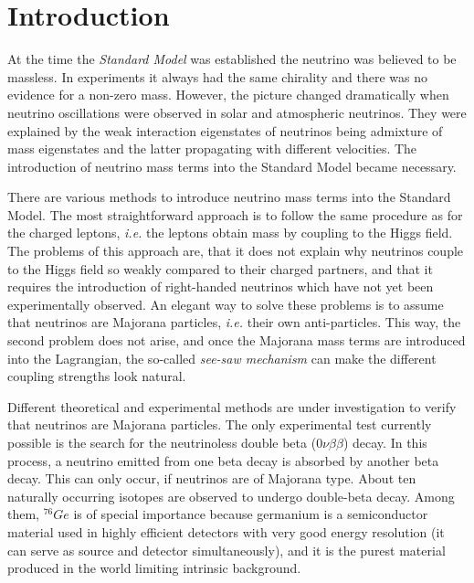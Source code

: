 \chapter*{Introduction}
\label{cha:intro}
At the time the \emph{Standard Model} was established the neutrino was believed to be massless. In experiments it always had the same chirality and there was no evidence for a non-zero mass. However, the picture changed dramatically when neutrino oscillations were observed in solar and atmospheric neutrinos. They were explained by the weak interaction eigenstates of neutrinos being admixture of mass eigenstates and the latter propagating with different velocities. The introduction of neutrino mass terms into the Standard Model became necessary.

There are various methods to introduce neutrino mass terms into the Standard Model. The most straightforward approach is to follow the same procedure as for the charged leptons, \textit{i.e.} the leptons obtain mass by coupling to the Higgs field. The problems of this approach are, that it does not explain why neutrinos couple to the Higgs field so weakly compared to their charged partners, and that it requires the introduction of right-handed neutrinos which have not yet been experimentally observed. An elegant way to solve these problems is to assume that neutrinos are Majorana particles, \textit{i.e.} their own anti-particles. This way, the second problem does not arise, and once the Majorana mass terms are introduced into the Lagrangian, the so-called \emph{see-saw mechanism} can make the different coupling strengths look natural.

Different theoretical and experimental methods are under investigation to verify that neutrinos are Majorana particles. The only experimental test currently possible is the search for the neutrinoless double beta ($0\nu\beta\beta$) decay. In this process, a neutrino emitted from one beta decay is absorbed by another beta decay. This can only occur, if neutrinos are of Majorana type. About ten naturally occurring isotopes are observed to undergo double-beta decay. Among them, $^{76}Ge$ is of special importance because germanium is a semiconductor material used in highly efficient detectors with very good energy resolution (it can serve as source and detector simultaneously), and it is the purest material produced in the world limiting intrinsic background.

